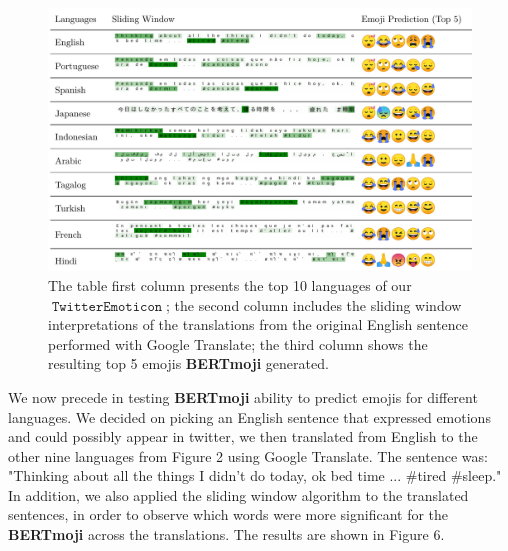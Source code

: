 \documentclass[11pt]{article}
\DeclareMathOperator{\emoticon}{\texttt{TwitterEmoticon}}
\begin{document}
\begin{figure}[!ht]
    \centering
    \includegraphics[width=\textwidth]{images/PREDICTMOJI.pdf}
    \caption{The table first column presents the top 10 languages of our $\emoticon$; 
    the second column includes the sliding window interpretations of the translations from the original English sentence performed with Google Translate;
    the third column shows the resulting top 5 emojis \textbf{BERTmoji} generated.
     }
    \label{fig:prediction_top10_langs}
\end{figure}

We now precede in testing \textbf{BERTmoji} ability to predict emojis for different languages.
We decided on picking an English sentence that expressed emotions and could possibly appear in twitter,
we then translated from English to the other nine languages from Figure 2 using Google Translate.
The sentence was: "Thinking about all the things I didn't do today, ok bed time ... \#tired \#sleep."
In addition, we also applied the sliding window algorithm to the translated sentences,
in order to observe which words were more significant for the \textbf{BERTmoji} across the translations.
The results are shown in Figure 6. 
\end{document}
